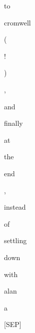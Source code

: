 \documentclass[varwidth=150mm]{standalone}
\begin{document}
\begin{CJK*}{UTF8}{gbsn}
{{{\colorbox{red!0.0}{\strut to} \colorbox{red!0.0}{\strut cromwell} \colorbox{red!0.0}{\strut (} \colorbox{red!0.0}{\strut !} \colorbox{red!0.0}{\strut )} \colorbox{red!0.0}{\strut ,} \colorbox{red!0.0}{\strut and} \colorbox{red!0.0}{\strut finally} \colorbox{red!0.0}{\strut at} \colorbox{red!0.0}{\strut the} \colorbox{red!0.0}{\strut end} \colorbox{red!0.0}{\strut ,} \colorbox{red!0.0}{\strut instead} \colorbox{red!0.0}{\strut of} \colorbox{red!0.0}{\strut settling} \colorbox{red!0.0}{\strut down} \colorbox{red!0.0}{\strut with} \colorbox{red!0.0}{\strut alan}\colorbox{red!0.0}{\strut a} \colorbox{red!3.4639430046081543}{\strut [SEP]}
}}}
\end{CJK*}
\end{document}
